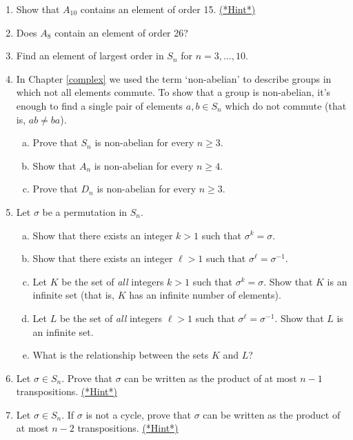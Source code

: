  
\begin{enumerate}
 
  
\item \label{ex:permute:Ad1}
Show that $A_{10}$ contains an element of order 15.
\hyperref[sec:permute:hints]{(*Hint*)}
 
 
\item
Does $A_8$ contain an element of order 26?
 
 
\item %
Find an element of largest order in $S_n$ for $n = 3, \ldots, 10$. 
 
  
 \item
In Chapter \ref{complex} we used the term `non-abelian' to describe groups in which not all elements commute. To show that a group is non-abelian, it's enough to find a single pair of elements $a, b \in S_n$ which do not commute (that is, $ab \neq ba$).
\begin{enumerate}[(a)]
\item
Prove that $S_n$ is non-abelian for every $n \geq 3$. 
\item
Show that $A_n$ is non-abelian for every $n \geq 4$.
\item
Prove that $D_n$ is non-abelian for every $n \geq 3$.
 \end{enumerate} 

\item
Let $\sigma$ be a permutation in $S_n$.  
\begin{enumerate}[(a)]
\item
Show that there exists an integer $k>1$ such that $\sigma^k = \sigma$.
\item
Show that there exists an integer $\ell>1$ such that $\sigma^{\ell} = \sigma^{-1}$.
\item
Let $K$ be the set of \emph{all} integers $k>1$ such that $\sigma^k = \sigma$. Show that $K$ is an infinite set (that is, $K$ has an infinite number of elements).
\item
Let $L$ be the set of \emph{all} integers $\ell>1$ such that $\sigma^{\ell} = \sigma^{-1}$. Show that $L$ is an infinite set.
\item
What is the relationship between the sets $K$ and $L$?
\end{enumerate}


\item \label{ex:permute:Ad2}
Let $\sigma \in S_n$. Prove that $\sigma$ can be written as the
product of at most $n-1$ transpositions.
\hyperref[sec:permute:hints]{(*Hint*)}

\item \label{ex:permute:Ad3}
Let $\sigma \in S_n$. If $\sigma$ is not a cycle, prove that $\sigma$
can be written as the product of at most $n-2$ transpositions.
\hyperref[sec:permute:hints]{(*Hint*)}


\end{enumerate}
